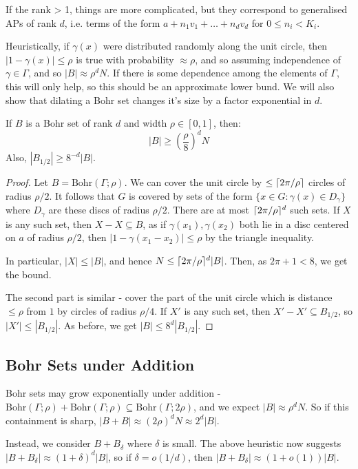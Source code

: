 \documentclass[10pt,a4paper]{article}
\begin{document}
If the rank > 1, things are more complicated, but they correspond to generalised APs of rank $d$, i.e. terms of the form $a+n_1v_1 + \ldots +n_dv_d$ for $0 \leq n_i < K_i$.

Heuristically, if $\gamma(x)$ were distributed randomly along the unit circle, then $|1-\gamma(x)| \leq \rho$ is true with probability $\approx \rho$, and so assuming independence of $\gamma \in \Gamma$, and so $|B| \approx \rho^d N$. If there is some dependence among the elements of $\Gamma$, this will only help, so this should be an approximate lower bund. We will also show that dilating a Bohr set changes it's size by a factor exponential in $d$.
\begin{lemma}
  If $B$ is a Bohr set of rank $d$ and width $\rho \in [0,1]$, then:
  \[|B| \geq \left(\frac{\rho}{8}\right)^d N\]
  Also, $|B_{1/2}| \geq 8^{-d}|B|$.
\end{lemma}
\begin{proof}
  Let $B = \text{Bohr}(\Gamma;\rho)$. We can cover the unit circle by $\leq \lceil 2\pi/\rho \rceil$ circles of radius $\rho/2$. It follows that $G$ is covered by sets of the form $\{x \in G: \gamma(x) \in D_\gamma\}$ where $D_\gamma$ are these discs of radius $\rho/2$. There are at most $\lceil 2\pi/\rho \rceil^d$ such sets. If $X$ is any such set, then $X - X \subseteq B$, as if $\gamma(x_1), \gamma(x_2)$ both lie in a disc centered on $a$ of radius $\rho/2$, then $|1-\gamma(x_1-x_2)| \leq \rho$ by the triangle inequality.

  In particular, $|X| \leq |B|$, and hence $N \leq \lceil 2\pi/\rho \rceil^d|B|$. Then, as $2\pi+1 < 8$, we get the bound.

  The second part is similar - cover the part of the unit circle which is distance $\leq \rho$ from $1$ by circles of radius $\rho/4$. If $X'$ is any such set, then $X'-X' \subseteq B_{1/2}$, so $|X'| \leq |B_{1/2}|$. As before, we get $|B| \leq 8^d|B_{1/2}|$.
\end{proof}
\subsection{Bohr Sets under Addition}
Bohr sets may grow exponentially under addition - $\text{Bohr}(\Gamma;\rho) + \text{Bohr}(\Gamma;\rho) \subseteq \text{Bohr}(\Gamma;2\rho)$, and we expect $|B| \approx \rho^d N$. So if this containment is sharp, $|B+B| \approx (2\rho)^d N \approx 2^d |B|$.

Instead, we consider $B+B_\delta$ where $\delta$ is small. The above heuristic now suggests $|B+B_\delta| \approx (1+\delta)^d |B|$, so if $\delta = o(1/d)$, then $|B+B_\delta| \approx (1+o(1))|B|$.
\end{document}
